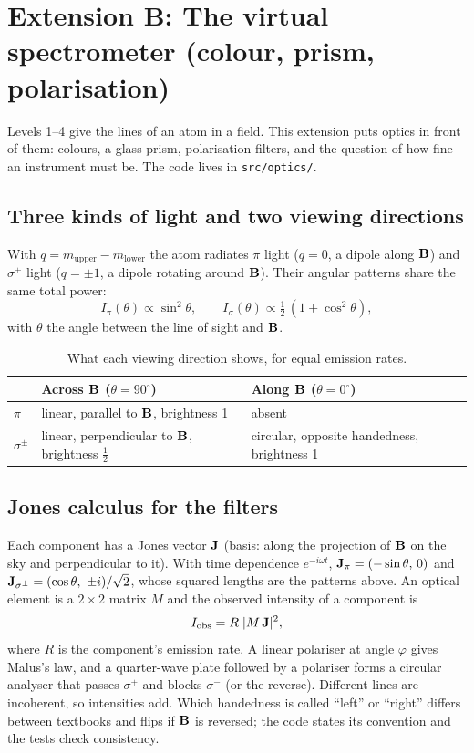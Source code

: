 \section{Extension B: The virtual spectrometer (colour, prism, polarisation)}
Levels 1--4 give the lines of an atom in a field. This extension puts optics in front of them:
colours, a glass prism, polarisation filters, and the question of how fine an instrument must be.
The code lives in \texttt{src/optics/}.

\subsection{Three kinds of light and two viewing directions}
With $q = m_\text{upper} - m_\text{lower}$ the atom radiates $\pi$ light ($q=0$, a dipole along $\vb{B}$)
and $\sigma^\pm$ light ($q=\pm1$, a dipole rotating around $\vb{B}$). Their angular patterns share the
same total power:
\begin{equation}
  I_\pi(\theta)\propto \sin^2\theta,\qquad
  I_{\sigma}(\theta)\propto \tfrac12\,(1+\cos^2\theta),
\end{equation}
with $\theta$ the angle between the line of sight and $\vb{B}$.
\begin{table}[h]
\centering
\begin{tabular}{lll}
\toprule
& Across $\vb{B}$ ($\theta=90^\circ$) & Along $\vb{B}$ ($\theta=0^\circ$)\\
\midrule
$\pi$ & linear, parallel to $\vb{B}$, brightness 1 & absent\\
$\sigma^\pm$ & linear, perpendicular to $\vb{B}$, brightness $\tfrac12$ & circular, opposite handedness, brightness 1\\
\bottomrule
\end{tabular}
\caption{What each viewing direction shows, for equal emission rates.}
\end{table}

\subsection{Jones calculus for the filters}
Each component has a Jones vector $\vb{J}$ (basis: along the projection of $\vb{B}$ on the sky and
perpendicular to it). With time dependence $e^{-i\omega t}$,
$\vb{J}_\pi=(-\sin\theta,\,0)$ and $\vb{J}_{\sigma^\pm}=(\cos\theta,\ \pm i)/\sqrt2$, whose squared lengths are the
patterns above. An optical element is a $2\times2$ matrix $M$ and the observed intensity of a component is
\begin{equation}
  I_\text{obs} = R\;\lvert M\,\vb{J}\rvert^2,
\end{equation}
where $R$ is the component's emission rate. A linear polariser at angle $\varphi$ gives Malus's law,
and a quarter-wave plate followed by a polariser forms a circular analyser that passes $\sigma^+$ and blocks
$\sigma^-$ (or the reverse). Different lines are incoherent, so intensities add. Which handedness is
called ``left'' or ``right'' differs between textbooks and flips if $\vb{B}$ is reversed; the code states its
convention and the tests check consistency.


